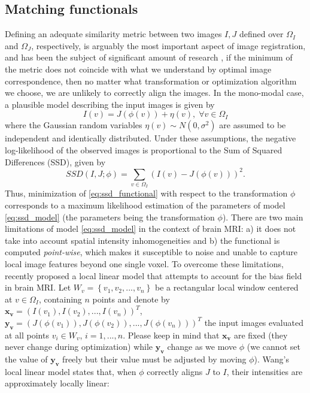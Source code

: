 \subsection{Matching functionals}
Defining an adequate similarity metric between two images $I, J$ defined over $\Omega_{I}$ and $\Omega_{J}$, respectively, is arguably the most important aspect of image registration, and has been the subject of significant amount of research \citep{Sotiras2013}, if the minimum of the metric does not coincide with what we understand by optimal image correspondence, then no matter what transformation or optimization algorithm we choose, we are unlikely to correctly align the images. In the mono-modal case, a plausible model describing the input images is given by
\begin{equation}\label{eq:ssd_model}
    I(v) = J(\phi(v)) + \eta(v), \; \forall v\in\Omega_{I}
\end{equation}
where the Gaussian random variables $\eta(v) \sim N(0, \sigma^{2})$ are assumed to be independent and identically distributed. Under these assumptions, the negative log-likelihood of the observed images is proportional to the Sum of Squared Differences (SSD), given by
\begin{equation}\label{eq:ssd_functional}
    SSD(I, J; \phi) = \sum_{v \in \Omega_{I}} \left(I(v) - J(\phi(v))\right)^{2}.
\end{equation}
Thus, minimization of \eqref{eq:ssd_functional} with respect to the transformation $\phi$ corresponds to a maximum likelihood estimation of the parameters of model \eqref{eq:ssd_model} (the parameters being the transformation $\phi$). There are two main limitations of model \eqref{eq:ssd_model} in the context of brain MRI: a) it does not take into account spatial intensity inhomogeneities and b) the functional is computed \emph{point-wise}, which makes it susceptible to noise and unable to capture local image features beyond one single voxel. To overcome these limitations, \cite{Wang2014} recently proposed a local linear model that attempts to account for the bias field in brain MRI. Let $W_{v} = \left\lbrace v_{1}, v_{2}, ..., v_{n} \right\rbrace$ be a rectangular local window centered at $v\in\Omega_{I}$, containing $n$ points and denote by $\mathbf{x_{v}} = (I(v_{1}), I(v_{2}), ..., I(v_{n}))^{T}$, $\mathbf{y_{v}} = (J(\phi(v_{1})), J(\phi(v_{2})), ..., J(\phi(v_{n})))^{T}$ the input images evaluated at all points $v_{i}\in W_{v}$, $i=1, ..., n$. Please keep in mind that $\mathbf{x_{v}}$ are fixed (they never change during optimization) while $\mathbf{y_{v}}$ change as we move $\phi$ (we cannot set the value of $\mathbf{y_{v}}$ freely but their value must be adjusted by moving $\phi$). Wang's local linear model states that, when $\phi$ correctly aligns $J$ to $I$, their intensities are approximately locally linear:
